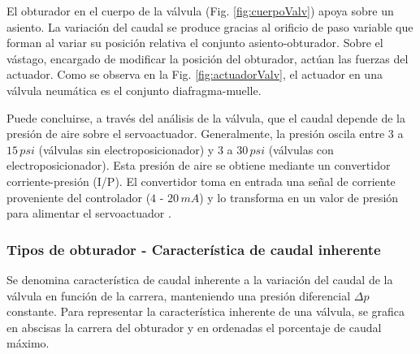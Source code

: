El obturador en el cuerpo de la válvula (Fig. \ref{fig:cuerpoValv}) apoya
sobre un asiento.
La variación del caudal se produce gracias al orificio de paso variable
que forman al variar su posición relativa el conjunto asiento-obturador.
Sobre el vástago, encargado de modificar la posición del obturador,
actúan las fuerzas del actuador.
Como se observa en la Fig. \ref{fig:actuadorValv}, el actuador en una válvula
neumática es el conjunto diafragma-muelle.

Puede concluirse, a través del análisis de la válvula, que el caudal depende de
la presión de aire sobre el servoactuador.
Generalmente, la presión oscila entre $3$ a $15\,psi$ (válvulas sin
electroposicionador) y $3$ a $30\,psi$ (válvulas con electroposicionador).
Esta presión de aire se obtiene mediante un convertidor
corriente-presión (I/P).
El convertidor toma en entrada una señal de corriente proveniente del
controlador
($4$ - $20\,mA$) y lo transforma en un valor de presión para alimentar el
servoactuador \cite{bib:ApuntesPuglesiValvulas}.


\subsubsection{Tipos de obturador - Característica de caudal inherente}
Se denomina característica de caudal inherente a la variación del caudal de
la válvula en función de la carrera, manteniendo una presión diferencial
$\Delta p$ constante.
Para representar la característica inherente de una válvula, se grafica en
abscisas la carrera del obturador y en ordenadas el porcentaje de caudal máximo.

